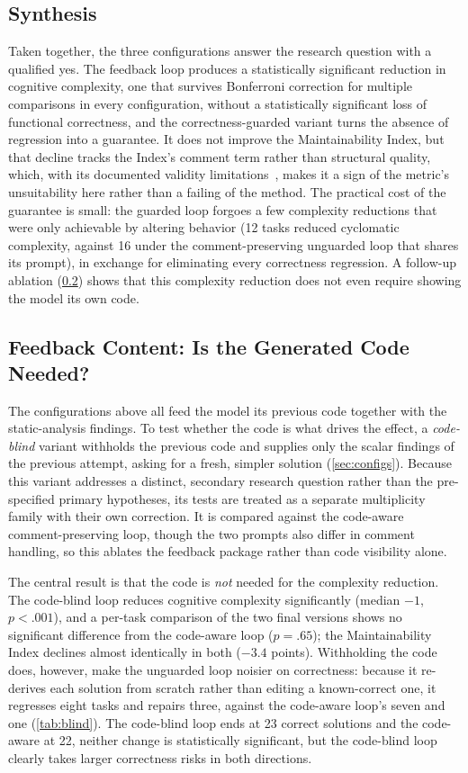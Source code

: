 \subsection{Synthesis}
Taken together, the three configurations answer the research question with a
qualified yes. The feedback loop produces a statistically significant reduction in
cognitive complexity, one that survives Bonferroni correction for multiple
comparisons in every configuration, without a statistically significant loss of
functional correctness, and the correctness-guarded variant turns the absence of
regression into a guarantee. It does not improve the Maintainability Index, but that decline tracks the Index's
comment term rather than structural quality, which, with its documented validity
limitations~\citep{heitlager2007maintainability}, makes it a sign of the metric's
unsuitability here rather than a failing of the method. The practical cost of the guarantee is small: the
guarded loop forgoes a few complexity reductions that were only achievable by
altering behavior (12 tasks reduced cyclomatic complexity, against 16 under the
comment-preserving unguarded loop that shares its prompt), in exchange for
eliminating every correctness regression. A follow-up
ablation (\cref{sec:blind}) shows that this complexity reduction does not even
require showing the model its own code.

\subsection{Feedback Content: Is the Generated Code Needed?}
\label{sec:blind}
The configurations above all feed the model its previous code together with the
static-analysis findings. To test whether the code is what drives the effect, a
\emph{code-blind} variant withholds the previous code and supplies only the
scalar findings of the previous attempt, asking for a fresh, simpler solution
(\cref{sec:configs}). Because this variant addresses a distinct, secondary
research question rather than the pre-specified primary hypotheses, its tests are
treated as a separate multiplicity family with their own correction. It is
compared against the
code-aware comment-preserving loop, though the two prompts also differ in comment
handling, so this ablates the feedback package rather than code visibility alone.

The central result is that the code is \emph{not} needed for the complexity
reduction. The code-blind loop reduces cognitive complexity significantly (median
$-1$, $p<.001$), and a per-task comparison of the two final versions shows no
significant difference from the code-aware loop ($p=.65$); the Maintainability
Index declines almost identically in both ($-3.4$ points). Withholding the code
does, however, make the unguarded loop noisier on correctness: because it
re-derives each solution from scratch rather than editing a known-correct one, it
regresses eight tasks and repairs three, against the code-aware loop's seven and
one (\cref{tab:blind}). The code-blind loop ends at 23 correct solutions and the code-aware at 22, neither change is statistically
significant, but the code-blind
loop clearly takes larger correctness risks in both directions.

